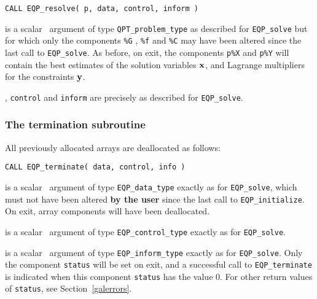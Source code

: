 \documentclass{galahad}
\newcommand{\packagename}{EQP}
\begin{document}
\hspace{8mm}
{\tt CALL \packagename\_resolve( p, data, control, inform )}

\vspace*{-3mm}
\begin{description}
 is a scalar \intentinout\ argument of type 
{\tt QPT\_problem\_type} as described for {\tt \packagename\_solve}
but for which only the components {\tt \%G} , {\tt \%f} and {\tt \%C} 
may have been altered since the last call to 
{\tt \packagename\_solve}.
As before, on exit, the components {\tt p\%X} and {\tt p\%Y}
will contain the best estimates of the solution variables ${\mathbf{x}}$, and
Lagrange multipliers for the constraints ${\mathbf{y}}$.

, {\tt control} and {\tt inform} are precisely as described for
 {\tt \packagename\_solve}.
\end{description}


\subsubsection{The  termination subroutine}
All previously allocated arrays are deallocated as follows:
\vspace*{1mm}

\hspace{8mm}
{\tt CALL \packagename\_terminate( data, control, info )}

\begin{description}

 is a scalar \intentinout\ argument of type 
{\tt \packagename\_data\_type} 
exactly as for
{\tt \packagename\_solve},
which must not have been altered {\bf by the user} since the last call to 
{\tt \packagename\_initialize}.
On exit, array components will have been deallocated.

 is a scalar \intentin\ argument of type 
{\tt \packagename\_control\_type}
exactly as for
{\tt \packagename\_solve}.

 is a scalar \intentout\ argument of type
{\tt \packagename\_inform\_type}
exactly as for
{\tt \packagename\_solve}.
Only the component {\tt status} will be set on exit, and a 
successful call to 
{\tt \packagename\_terminate}
is indicated when this  component {\tt status} has the value 0. 
For other return values of {\tt status}, see Section~\ref{galerrors}.

\end{description}
\end{document}
